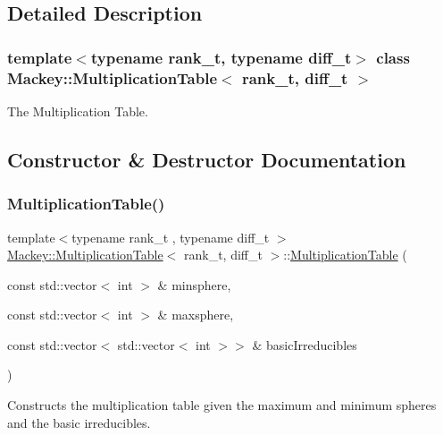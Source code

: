\subsection{Detailed Description}
\subsubsection*{template$<$typename rank\+\_\+t, typename diff\+\_\+t$>$\newline
class Mackey\+::\+Multiplication\+Table$<$ rank\+\_\+t, diff\+\_\+t $>$}

The Multiplication Table. 

\subsection{Constructor \& Destructor Documentation}
\mbox{\label{classMackey_1_1MultiplicationTable_a3a7fcf71b8235a641b3e716064a3e384}} 
\subsubsection{\texorpdfstring{Multiplication\+Table()}{MultiplicationTable()}}
{\footnotesize\ttfamily template$<$typename rank\+\_\+t , typename diff\+\_\+t $>$ \\
\hyperlink{classMackey_1_1MultiplicationTable}{Mackey\+::\+Multiplication\+Table}$<$ rank\+\_\+t, diff\+\_\+t $>$\+::\hyperlink{classMackey_1_1MultiplicationTable}{Multiplication\+Table} (\begin{DoxyParamCaption}\item[{const std\+::vector$<$ int $>$ \&}]{minsphere,  }\item[{const std\+::vector$<$ int $>$ \&}]{maxsphere,  }\item[{const std\+::vector$<$ std\+::vector$<$ int $>$$>$ \&}]{basic\+Irreducibles }\end{DoxyParamCaption})\hspace{0.3cm}{\ttfamily [protected]}}



Constructs the multiplication table given the maximum and minimum spheres and the basic irreducibles. 

